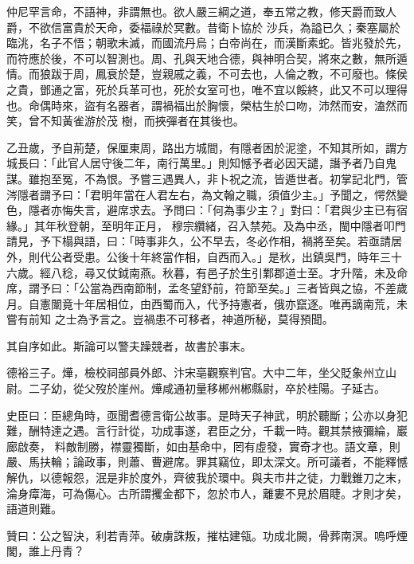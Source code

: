 \begin{pinyinscope}
 仲尼罕言命，不語神，非謂無也。欲人嚴三綱之道，奉五常之教，修天爵而致人爵，不欲信富貴於天命，委福祿於冥數。昔衛卜協於
 沙兵，為謚已久；秦塞屬於臨洮，名子不悟；朝歌未滅，而國流丹烏；白帝尚在，而漢斷素蛇。皆兆發於先，而符應於後，不可以智測也。周、孔與天地合德，與神明合契，將來之數，無所遁情。而狼跋于周，鳳衰於楚，豈親戚之義，不可去也，人倫之教，不可廢也。條侯之貴，鄧通之富，死於兵革可也，死於女室可也，唯不宜以餒終，此又不可以理得也。命偶時來，盜有名器者，謂禍福出於胸懷，榮枯生於口吻，沛然而安，溘然而笑，曾不知黃雀游於茂
 樹，而挾彈者在其後也。



 乙丑歲，予自荊楚，保厘東周，路出方城間，有隱者困於泥塗，不知其所如，謂方城長曰：「此官人居守後二年，南行萬里。」則知憾予者必因天譴，譖予者乃自鬼謀。雖抱至冤，不為恨。予嘗三遇異人，非卜祝之流，皆遁世者。初掌記北門，管涔隱者謂予曰：「君明年當在人君左右，為文翰之職，須值少主。」予聞之，愕然變色，隱者亦悔失言，避席求去。予問曰：「何為事少主？」對曰：「君與少主已有宿緣。」其年秋登朝，至明年正月，
 穆宗纘緒，召入禁苑。及為中丞，閩中隱者叩門請見，予下榻與語，曰：「時事非久，公不早去，冬必作相，禍將至矣。若亟請居外，則代公者受患。公後十年終當作相，自西而入。」是秋，出鎮吳門，時年三十六歲。經八稔，尋又仗鉞南燕。秋暮，有邑子於生引鄴郡道士至。才升階，未及命席，謂予曰：「公當為西南節制，孟冬望舒前，符節至矣。」三者皆與之協，不差歲月。自憲闈竟十年居相位，由西蜀而入，代予持憲者，俄亦竄逐。唯再謫南荒，未嘗有前知
 之士為予言之。豈禍患不可移者，神道所秘，莫得預聞。



 其自序如此。斯論可以警夫躁競者，故書於事末。



 德裕三子。燁，檢校祠部員外郎、汴宋亳觀察判官。大中二年，坐父貶象州立山尉。二子幼，從父歿於崖州。燁咸通初量移郴州郴縣尉，卒於桂陽。子延古。



 史臣曰：臣總角時，亟聞耆德言衛公故事。是時天子神武，明於聽斷；公亦以身犯難，酬特達之遇。言行計從，功成事遂，君臣之分，千載一時。觀其禁掖彌綸，巖廊啟奏，
 料敵制勝，襟靈獨斷，如由基命中，罔有虛發，實奇才也。語文章，則嚴、馬扶輪；論政事，則蕭、曹避席。罪其竊位，即太深文。所可議者，不能釋憾解仇，以德報怨，泯是非於度外，齊彼我於環中。與夫市井之徒，力戰錐刀之末，淪身瘴海，可為傷心。古所謂攫金都下，忽於市人，離婁不見於眉睫。才則才矣，語道則難。



 贊曰：公之智決，利若青萍。破虜誅叛，摧枯建瓴。功成北闕，骨葬南溟。嗚呼煙閣，誰上丹青？



\end{pinyinscope}